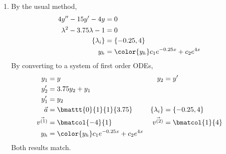 \begin{enumerate}
    \item By the usual method,
          \begin{align}
              4y'' - 15y' - 4y              & = 0                          \\
              \lambda^{2} - 3.75\lambda - 1 & = 0                          \\
              \{\lambda_i\}                 & = \{-0.25, 4\}               \\
              y_h                           & = \color{y_h} c_1 e^{-0.25x}
              + c_2 e^{4x}
          \end{align}
          By converting to a system of first order ODEs,
          \begin{align}
              y_1           & = y                                       &
              y_2           & = y'                                        \\
              y_2'          & = 3.75y_2 + y_1                             \\
              y_1'          & = y_2                                       \\
              \vec{a}       & = \bmattt{0}{1}{1}{3.75}                  &
              \{\lambda_i\} & = \{-0.25, 4\}                              \\
              \vec{v^{(1)}} & = \bmatcol{-4}{1}                         &
              \vec{v^{(2)}} & = \bmatcol{1}{4}                            \\
              y_h           & = \color{y_h} c_1 e^{-0.25x} + c_2 e^{4x}
          \end{align}
          Both results match.


\end{enumerate}

